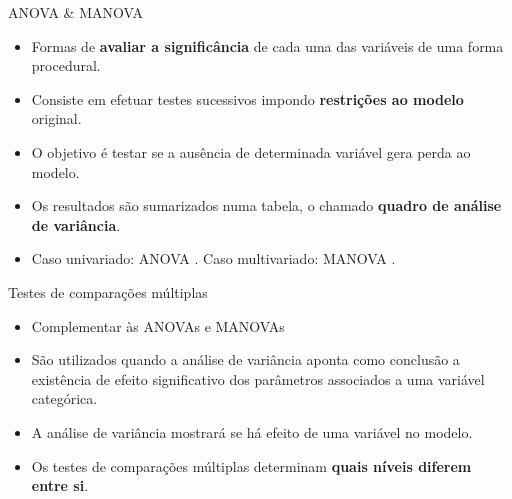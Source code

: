 \documentclass[
  ignorenonframetext,
  serif,
  professionalfont,
  usenames,
  dvipsnames,
  aspectratio = 169]{beamer}
\begin{document}
\begin{frame}{ANOVA \& MANOVA}
\protect\hypertarget{anova-manova}{}
\begin{itemize}
    \itemsep 2ex

  \item Formas de \textbf{avaliar a significância} de cada uma das variáveis de uma forma procedural.  
  
  \item Consiste em efetuar testes sucessivos impondo \textbf{restrições ao modelo} original. 

  \item O objetivo é testar se a ausência de determinada variável gera perda ao modelo. 

  \item Os resultados são sumarizados numa tabela, o chamado \textbf{quadro de análise de variância}.

  \item Caso univariado: ANOVA \citep{anova_fisher}. Caso multivariado: MANOVA \citep{manova}.
  
  \end{itemize}
\end{frame}

\begin{frame}{Testes de comparações múltiplas}
\protect\hypertarget{testes-de-comparauxe7uxf5es-muxfaltiplas}{}
\begin{itemize}
  \itemsep 2ex
    
  \item Complementar às ANOVAs e MANOVAs

  \item São utilizados quando a análise de variância aponta como conclusão a existência de efeito significativo dos parâmetros associados a uma variável categórica.

  \item A análise de variância mostrará se há efeito de uma variável no modelo.
 
  \item Os testes de comparações múltiplas determinam \textbf{quais níveis diferem entre si}. 

\end{itemize}
\end{frame}
\end{document}

